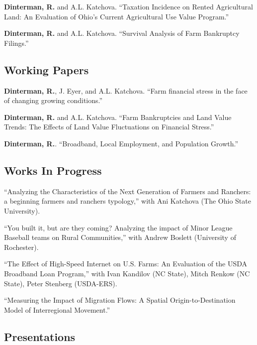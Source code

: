 \documentclass[letterpaper]{article}
\renewenvironment{itemize}{
  \begin{list}{}{
    \setlength{\leftmargin}{1.5em}
  }
}{
  \end{list}
}
\begin{document}
\begin{itemize}
\item \textbf{Dinterman, R.} and A.L. Katchova. ``Taxation Incidence on Rented Agricultural Land: An Evaluation of Ohio's Current Agricultural Use Value Program.''
\item \textbf{Dinterman, R.} and A.L. Katchova. ``Survival Analysis of Farm Bankruptcy Filings.''
\end{itemize}

\subsection*{Working Papers}

\begin{itemize}
\item \textbf{Dinterman, R.}, J. Eyer, and A.L. Katchova. ``Farm financial stress in the face of changing growing conditions.''
\item \textbf{Dinterman, R.} and A.L. Katchova. ``Farm Bankruptcies and Land Value Trends: The Effects of Land Value Fluctuations on Financial Stress.''
\item \textbf{Dinterman, R.}. ``Broadband, Local Employment, and Population Growth.''
\end{itemize}

\subsection*{Works In Progress}

\begin{itemize}
\item ``Analyzing the Characteristics of the Next Generation of Farmers and Ranchers: a beginning farmers and ranchers typology,'' with Ani Katchova (The Ohio State University).
\item ``You built it, but are they coming? Analyzing the impact of Minor League Baseball teams on Rural Communities,'' with Andrew Boslett (University of Rochester).
\item ``The Effect of High-Speed Internet on U.S. Farms: An Evaluation of the USDA Broadband Loan Program,'' with Ivan Kandilov (NC State), Mitch Renkow (NC State), Peter Stenberg (USDA-ERS).
\item ``Measuring the Impact of Migration Flows: A Spatial Origin-to-Destination Model of Interregional Movement.''
\end{itemize}

\subsection*{Presentations}
\end{document}
